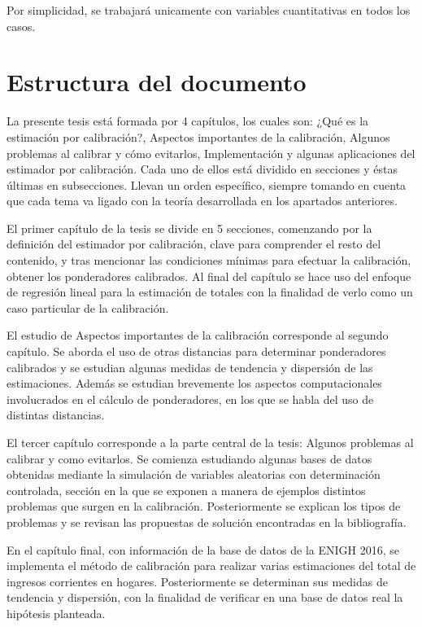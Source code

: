 \documentclass[a4paper,twoside,openright,12pt]{book}
\theoremstyle{definition}
\numberwithin{equation}{chapter}
\numberwithin{figure}{chapter}
\numberwithin{table}{chapter}
\numberwithin{theorem}{chapter}
\numberwithin{lemma}{chapter}
\begin{document}
Por simplicidad, se trabajará unicamente con variables cuantitativas en todos los casos.
\section*{Estructura del documento}
La presente tesis está formada por 4 capítulos, los cuales son: ¿Qué es la estimación por calibración?, Aspectos importantes de la calibración, Algunos problemas al calibrar y cómo evitarlos, Implementación y algunas aplicaciones del estimador por calibración. %
Cada uno de ellos está dividido en secciones y éstas últimas en subsecciones. Llevan un orden específico, siempre tomando en cuenta que cada tema va ligado con la teoría desarrollada en los apartados anteriores.

El primer capítulo de la tesis se divide en 5 secciones, comenzando por la definición del estimador por calibración, clave para comprender el resto del contenido, y tras mencionar las condiciones mínimas para efectuar la calibración, obtener los ponderadores calibrados. Al final del capítulo se hace uso del enfoque de regresión lineal para la estimación de totales con la finalidad de verlo como un caso particular de la calibración.

El estudio de Aspectos importantes de la calibración corresponde al segundo capítulo. Se aborda el uso de otras distancias para determinar ponderadores calibrados y se estudian algunas medidas de tendencia y dispersión de las estimaciones. Además se estudian brevemente los aspectos computacionales involucrados en el cálculo de ponderadores, en los que se habla del uso de distintas distancias.

El tercer capítulo corresponde a la parte central de la tesis: Algunos problemas al calibrar y como evitarlos. Se comienza estudiando algunas bases de datos obtenidas mediante la simulación de variables aleatorias con determinación controlada, sección en la que se exponen a manera de ejemplos distintos problemas que surgen en la calibración. Posteriormente se explican los tipos de problemas y se revisan las propuestas de solución encontradas en la bibliografía.

En el capítulo final, con información de la base de datos de la ENIGH 2016, se implementa el método de calibración para realizar varias estimaciones del total de ingresos corrientes en hogares. Posteriormente se determinan sus medidas de tendencia y dispersión, con la finalidad de verificar en una base de datos real la hipótesis planteada.
\end{document}
